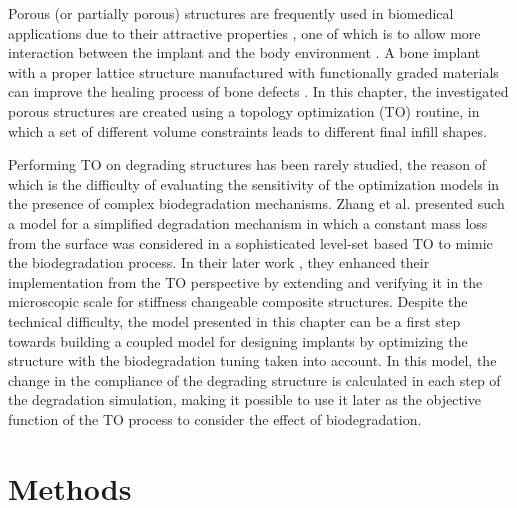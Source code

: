 Porous (or partially porous) structures are frequently used in biomedical applications due to their attractive properties , one of which is to allow more interaction between the implant and the body environment \cite{Birmingham2012}. A bone implant with a proper lattice structure manufactured with functionally graded materials can improve the healing process of bone defects \cite{Mahmoud2017}. In this chapter, the investigated porous structures are created using a topology optimization (\gls{TO}) routine, in which a set of different volume constraints leads to different final infill shapes.

Performing \gls{TO} on degrading structures has been rarely studied, the reason of which is the difficulty of evaluating the sensitivity of the optimization models in the presence of complex biodegradation mechanisms. Zhang et al. \cite{Zhang2021} presented such a model for a simplified degradation mechanism in which a constant mass loss from the surface was considered in a sophisticated level-set based \gls{TO} to mimic the biodegradation process. In their later work \cite{Zhang2021a}, they enhanced their implementation from the \gls{TO} perspective by extending and verifying it in the microscopic scale for stiffness changeable composite structures. Despite the technical difficulty, the model presented in this chapter can be a first step towards building a coupled model for designing implants by optimizing the structure with the biodegradation tuning taken into account. In this model, the change in the compliance of the degrading structure is calculated in each step of the degradation simulation, making it possible to use it later as the objective function of the \gls{TO} process to consider the effect of biodegradation.


\section{Methods}

